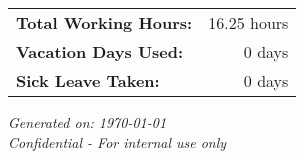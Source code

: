 \documentclass[11pt]{article}
\begin{document}
\vspace{0.5cm}
\begin{tabularx}{\textwidth}{Xr}
    \textbf{Total Working Hours:} & 16.25 hours \\
    \textbf{Vacation Days Used:} & 0 days \\
    \textbf{Sick Leave Taken:} & 0 days \\[0.5cm]
\end{tabularx}
\begin{flushleft}
    \small
    \textit{Generated on: \today} \\
    \textit{Confidential - For internal use only}
\end{flushleft}
\end{document}
